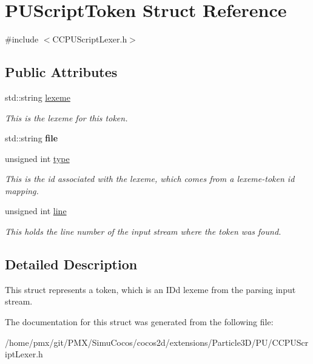 \hypertarget{structPUScriptToken}{}\section{P\+U\+Script\+Token Struct Reference}
\label{structPUScriptToken}


{\ttfamily \#include $<$C\+C\+P\+U\+Script\+Lexer.\+h$>$}

\subsection*{Public Attributes}
\begin{DoxyCompactItemize}
\item 
\mbox{\label{structPUScriptToken_a37e306ae647632544958d7a2379d513f}} 
std\+::string \hyperlink{structPUScriptToken_a37e306ae647632544958d7a2379d513f}{lexeme}
\begin{DoxyCompactList}\small\item\em This is the lexeme for this token. \end{DoxyCompactList}\item 
\mbox{\label{structPUScriptToken_aa59b65ce00c6d771e09f0aa06542430a}} 
std\+::string {\bfseries file}
\item 
\mbox{\label{structPUScriptToken_ab7bfd38159eade95804ce08dd24a982c}} 
unsigned int \hyperlink{structPUScriptToken_ab7bfd38159eade95804ce08dd24a982c}{type}
\begin{DoxyCompactList}\small\item\em This is the id associated with the lexeme, which comes from a lexeme-\/token id mapping. \end{DoxyCompactList}\item 
\mbox{\label{structPUScriptToken_af073ca5316faaf9f1c0f26da0ea70ec3}} 
unsigned int \hyperlink{structPUScriptToken_af073ca5316faaf9f1c0f26da0ea70ec3}{line}
\begin{DoxyCompactList}\small\item\em This holds the line number of the input stream where the token was found. \end{DoxyCompactList}\end{DoxyCompactItemize}


\subsection{Detailed Description}
This struct represents a token, which is an ID\textquotesingle{}d lexeme from the parsing input stream. 

The documentation for this struct was generated from the following file\+:\begin{DoxyCompactItemize}
\item 
/home/pmx/git/\+P\+M\+X/\+Simu\+Cocos/cocos2d/extensions/\+Particle3\+D/\+P\+U/C\+C\+P\+U\+Script\+Lexer.\+h\end{DoxyCompactItemize}

